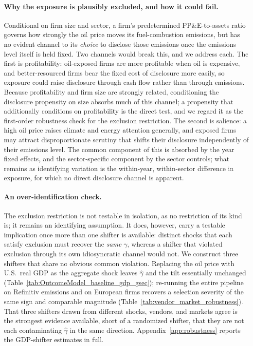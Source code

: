 \documentclass[a4paper,12pt]{article}
\begin{document}
\paragraph{Why the exposure is plausibly excluded, and how it could fail.} Conditional on firm size and sector, a firm's predetermined PP\&E-to-assets ratio governs how strongly the oil price moves its fuel-combustion emissions, but has no evident channel to its \emph{choice} to disclose those emissions once the emissions level itself is held fixed. Two channels would break this, and we address each. The first is profitability: oil-exposed firms are more profitable when oil is expensive, and better-resourced firms bear the fixed cost of disclosure more easily, so exposure could raise disclosure through cash flow rather than through emissions. Because profitability and firm size are strongly related, conditioning the disclosure propensity on size absorbs much of this channel; a propensity that additionally conditions on profitability is the direct test, and we regard it as the first-order robustness check for the exclusion restriction. The second is salience: a high oil price raises climate and energy attention generally, and exposed firms may attract disproportionate scrutiny that shifts their disclosure independently of their emissions level. The common component of this is absorbed by the year fixed effects, and the sector-specific component by the sector controls; what remains as identifying variation is the within-year, within-sector difference in exposure, for which no direct disclosure channel is apparent.

\paragraph{An over-identification check.} The exclusion restriction is not testable in isolation, as no restriction of its kind is; it remains an identifying assumption. It does, however, carry a testable implication once more than one shifter is available: distinct shocks that each satisfy exclusion must recover the \emph{same} $\gamma$, whereas a shifter that violated exclusion through its own idiosyncratic channel would not. We construct three shifters that share no obvious common violation. Replacing the oil price with U.S.\ real GDP as the aggregate shock leaves $\hat\gamma$ and the tilt essentially unchanged (Table~\ref{tab:OutcomeModel_baseline_gdp_gsec}); re-running the entire pipeline on Refinitiv emissions and on European firms recovers a selection severity of the same sign and comparable magnitude (Table~\ref{tab:vendor_market_robustness}). That three shifters drawn from different shocks, vendors, and markets agree is the strongest evidence available, short of a randomized shifter, that they are not each contaminating $\hat\gamma$ in the same direction. Appendix~\ref{app:robustness} reports the GDP-shifter estimates in full.
\end{document}
